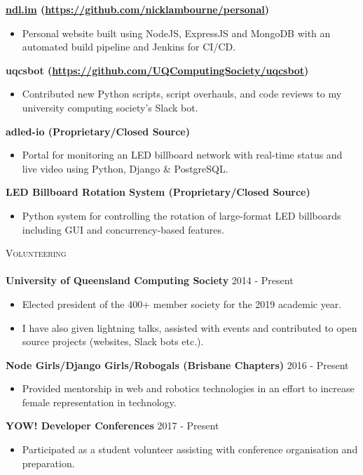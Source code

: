 \documentclass[a4paper]{article}
\newcommand{\lineunder} {
    \vspace*{-8pt} \\
    \hspace*{-10pt} \hrulefill \\
}
\newcommand{\header} [1] {
    {\hspace*{-10pt}\vspace*{6pt} \textsc{#1}}
    \vspace*{-6pt} \lineunder
}
\newenvironment{singleitem}
{   \small
    \vspace{-2.6pt}
    \begin{itemize}
    \setlength{\itemsep}{0pt}
    \setlength{\parskip}{0pt}
    \setlength{\parsep}{0pt}   }
{\end{itemize} \vspace{-2.6pt}	}
\begin{document}
\textbf{\href{https://ndl.im}{ndl.im} (\href{https://github.com/nicklambourne/personal}{https://github.com/nicklambourne/personal})}
\begin{singleitem}
	\item Personal website built using NodeJS, ExpressJS and MongoDB with an automated build pipeline and Jenkins for CI/CD.
\end{singleitem}

\textbf{uqcsbot (\href{https://github.com/UQComputingSociety/uqcsbot}{https://github.com/UQComputingSociety/uqcsbot})}
\begin{singleitem}
	\item Contributed new Python scripts, script overhauls, and code reviews to my university computing society's Slack bot.
\end{singleitem}

\textbf{adled-io (Proprietary/Closed Source)}
\begin{singleitem}
	\item Portal for monitoring an LED billboard network with real-time status and live video using Python, Django \& PostgreSQL.
\end{singleitem}

\textbf{LED Billboard Rotation System (Proprietary/Closed Source)}
\begin{singleitem}
	\item Python system for controlling the rotation of large-format LED billboards including GUI and concurrency-based features.
\end{singleitem}

\vspace{0mm}

\header{Volunteering}
\textbf{University of Queensland Computing Society} \hfill 2014 - Present\\
\begin{singleitem}
	\item Elected president of the 400+ member society for the 2019 academic year.
	\item I have also given lightning talks, assisted with events and contributed to open source projects (websites, Slack bots etc.).
\end{singleitem}
\textbf{Node Girls/Django Girls/Robogals (Brisbane Chapters)} \hfill 2016 - Present\\
\begin{singleitem}
	\item Provided mentorship in web and robotics technologies in an effort to increase female representation in technology.
\end{singleitem}
\textbf{YOW! Developer Conferences} \hfill 2017 - Present\\
\begin{singleitem}
	\item Participated as a student volunteer assisting with conference organisation and preparation.
\end{singleitem}
\end{document}
